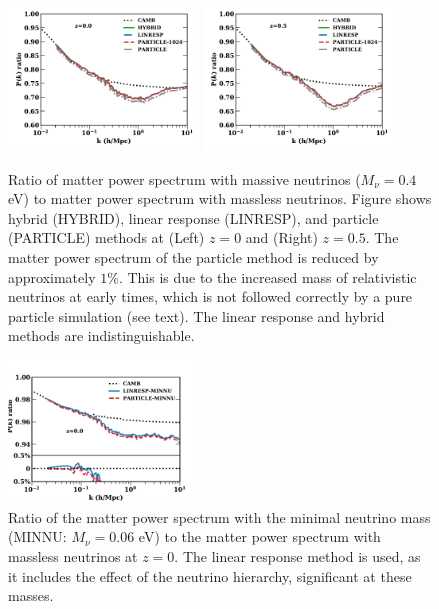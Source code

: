 \documentclass[useAMS, usenatbib]{mnras}
\begin{document}
\begin{figure}
\includegraphics[width=0.45\textwidth]{nuplots/pks_rel-10.pdf}
\includegraphics[width=0.45\textwidth]{nuplots/pks_rel-0_66670.pdf}
  \caption{Ratio of matter power spectrum with massive neutrinos ($M_\nu = 0.4$ eV) to matter power spectrum with massless neutrinos. Figure shows hybrid (HYBRID), linear response (LINRESP), and particle (PARTICLE) methods at (Left) $z=0$ and (Right) $z=0.5$. The matter power spectrum of the particle method is reduced by approximately $1\%$. This is due to the increased mass of relativistic neutrinos at early times, which is not followed correctly by a pure particle simulation (see text). The linear response and hybrid methods are indistinguishable.
  }
  \label{fig:matter_power}
\end{figure}

\begin{figure}
\includegraphics[width=0.45\textwidth]{nuplots/pks_lowmass-10.pdf}
\caption{Ratio of the matter power spectrum with the minimal neutrino mass (MINNU: $M_\nu = 0.06$ eV) to the matter power spectrum with massless neutrinos at $z=0$. The linear response method is used, as it includes the effect of the neutrino hierarchy, significant at these masses.
}
\label{fig:minimal_mass}
\end{figure}
\end{document}
